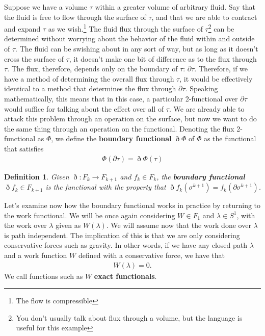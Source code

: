 \documentclass{book}
\newtheorem{defn}[equation]{Definition}
\begin{document}
Suppose we have a volume $\tau$ within a greater volume of arbitrary fluid. Say that the fluid is free to flow through the surface of $\tau$, and that we are able to contract and expand $\tau$ as we wish.\footnote{The flow is compressible} The fluid flux through the surface of $\tau$\footnote{You don't usually talk about flux through a volume, but the language is useful for this example} can be determined without worrying about the behavior of the fluid within and outside of $\tau$. The fluid can be swishing about in any sort of way, but as long as it doesn't cross the surface of $\tau$, it doesn't make one bit of difference as to the flux through $\tau$. The flux, therefore, depends only on the boundary of $\tau$: $\partial\tau$. Therefore, if we have a method of determining the overall flux through $\tau$, it would be effectively identical to a method that determines the flux through $\partial\tau$. Speaking mathematically, this means that in this case, a particular 2-functional over $\partial\tau$ would suffice for talking about the effect over all of $\tau$. We are already able to attack this problem through an operation on the surface, but now we want to do the same thing through an operation on the functional. Denoting the flux 2-functional as $\Phi$, we define the \textbf{boundary functional} $\eth\Phi$ of $\Phi$ as the functional that satisfies \begin{gather} \Phi(\partial\tau) = \eth\Phi(\tau) \end{gather}

\begin{defn}
	Given $\eth : F_k \to F_{k+1}$ and $f_k \in F_k$, the \textbf{boundary functional} $\eth f_k \in F_{k+1}$ is the functional with the property that $\eth f_k(\sigma^{k+1}) = f_k(\partial \sigma^{k+1})$. 
\end{defn}



Let's examine now how the boundary functional works in practice by returning to the work functional. We will be once again considering $W \in F_1$ and $\lambda \in S^1$, with the work over $\lambda$ given as $W(\lambda)$. We will assume now that the work done over $\lambda$ is path independent. The implication of this is that we are only considering conservative forces such as gravity. In other words, if we have any closed path $\lambda$ and a work function $W$ defined with a conservative force, we have that \begin{gather} W(\lambda) = 0. \end{gather} We call functions such as $W$ \textbf{exact functionals}.   
\end{document}

